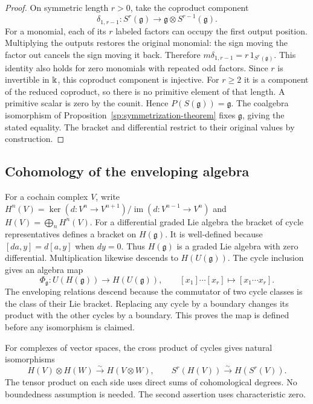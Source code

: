 \begin{proof}
On symmetric length $r>0$, take the coproduct component
\[
 \delta_{1,r-1}:S^r(\mathfrak g)
 \longrightarrow \mathfrak g\otimes S^{r-1}(\mathfrak g).
\]
For a monomial, each of its $r$ labeled factors can occupy the first
output position.  Multiplying the outputs restores the original
monomial: the sign moving the factor out cancels the sign moving it
back.  Therefore $m\delta_{1,r-1}=r\,1_{S^r(\mathfrak g)}$.
This identity also holds for zero monomials with repeated odd factors.
Since $r$ is invertible in $\Bbbk$, this coproduct component is injective.
For $r\geq2$ it is a component of the reduced coproduct, so there is
no primitive element of that length.  A primitive scalar is zero by
the counit.  Hence $P(S(\mathfrak g))=\mathfrak g$.
The coalgebra isomorphism of
Proposition~\ref{sp:symmetrization-theorem} fixes $\mathfrak g$, giving
the stated equality.  The bracket and differential restrict to their
original values by construction.
\end{proof}

\subsection{Cohomology of the enveloping algebra}

For a cochain complex $V$, write
$H^n(V)=\ker(d:V^n\to V^{n+1})/\operatorname{im}(d:V^{n-1}\to V^n)$
and $H(V)=\bigoplus_nH^n(V)$.
For a differential graded Lie algebra the bracket of cycle
representatives defines a bracket on $H(\mathfrak g)$.
It is well-defined because $[da,y]=d[a,y]$ when $dy=0$.
Thus $H(\mathfrak g)$ is a graded Lie algebra with zero differential.
Multiplication likewise descends to $H(U(\mathfrak g))$.
The cycle inclusion gives an algebra map
\begin{equation}
 \Phi_{\mathfrak g}:U(H(\mathfrak g))\longrightarrow H(U(\mathfrak g)),
 \qquad [x_1]\cdots[x_r]\longmapsto[x_1\cdots x_r].
 \label{sp:cohomology-map}
\end{equation}
The enveloping relations descend because the commutator of two cycle
classes is the class of their Lie bracket.  Replacing any cycle by a
boundary changes its product with the other cycles by a boundary.
This proves the map is defined before any isomorphism is claimed.

\begin{lemma}
\label{sp:kunnethtensor}
For complexes of vector spaces, the cross product of cycles gives
natural isomorphisms
\[
 H(V)\otimes H(W)\xrightarrow{\sim}H(V\otimes W),\qquad
 S^r(H(V))\xrightarrow{\sim}H(S^r(V)).
\]
The tensor product on each side uses direct sums of cohomological
degrees.  No boundedness assumption is needed.  The second assertion
uses characteristic zero.
\end{lemma}


